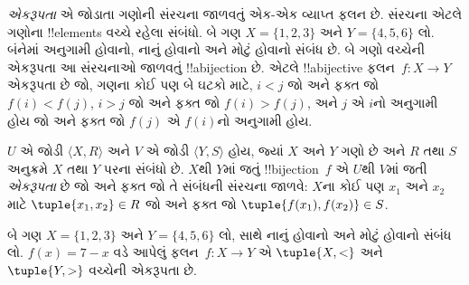 \documentclass[../../../include/open-logic-section]{subfiles}
\begin{document}

\begin{explain}
\emph{એકરૂપતા} એ જોડાતા ગણોની સંરચના જાળવતું એક-એક વ્યાપ્ત ફલન છે.
સંરચના એટલે ગણોના !!{element}s વચ્ચે રહેલા સંબંધો.
બે ગણ $X=\{1,2,3\}$ અને $Y=\{4,5,6\}$ લો.
બંનેમાં અનુગામી હોવાનો, નાનું હોવાનો અને મોટું હોવાનો સંબંધ છે.
બે ગણો વચ્ચેની એકરૂપતા આ સંરચનાઓ જાળવતું !!a{bijection} છે.
એટલે !!a{bijective} ફલન~$f \colon X
\to Y$ એકરૂપતા છે જો, ગણના કોઈ પણ બે ઘટકો માટે,
$i<j$ જો અને ફક્ત જો $f(i)<f(j)$,
$i>j$ જો અને ફક્ત જો $f(i)>f(j)$,
અને $j$ એ $i$નો અનુગામી હોય જો અને ફક્ત જો $f(j)$ એ
$f(i)$નો અનુગામી હોય.
\end{explain}

\begin{defn}[એકરૂપતા]
$U$ એ જોડી $\langle X, R\rangle$ અને $V$ એ જોડી
$\langle Y, S\rangle$ હોય, જ્યાં $X$ અને $Y$ ગણો છે અને
$R$ તથા $S$ અનુક્રમે $X$ તથા $Y$ પરના સંબંધો છે.
$X$થી $Y$માં જતું !!{bijection}~$f$ એ $U$થી $V$માં જતી
\emph{એકરૂપતા} છે જો અને ફક્ત જો તે સંબંધની સંરચના જાળવે:
$X$ના કોઈ પણ $x_{1}$ અને $x_{2}$ માટે
$\tuple{x_1,x_2} \in R$ જો અને ફક્ત જો
$\tuple{f(x_1),f(x_2)} \in S$.
\end{defn}

\begin{ex}
બે ગણ $X=\{1,2,3\}$ અને $Y=\{4,5,6\}$ લો,
સાથે નાનું હોવાનો અને મોટું હોવાનો સંબંધ લો.
$f(x) = 7-x$ વડે આપેલું ફલન~$f\colon X \to Y$
એ $\tuple{X,<}$ અને $\tuple{Y,>}$ વચ્ચેની એકરૂપતા છે.
\end{ex}
\end{document}
